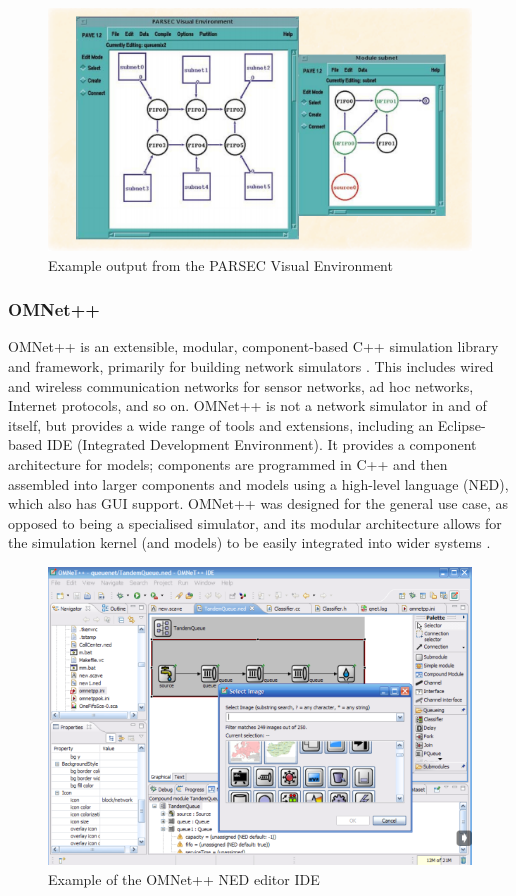 \begin{figure}
\centering	
\includegraphics[scale=0.4]{img/pave}	
\caption{Example output from the PARSEC Visual Environment}
\end{figure}

\subsubsection{OMNet++}
OMNet++ is an extensible, modular, component-based C++ simulation library and framework, primarily for building network simulators \cite{omnet2016}. This includes wired and wireless communication networks for sensor networks, ad hoc networks, Internet protocols, and so on. OMNet++ is not a network simulator in and of itself, but provides a wide range of tools and extensions, including an Eclipse-based IDE (Integrated Development Environment). It provides a component architecture for models; components are programmed in C++ and then assembled into larger components and models using a high-level language (NED), which also has GUI support. OMNet++ was designed for the general use case, as opposed to being a specialised simulator, and its modular architecture allows for the simulation kernel (and models) to be easily integrated into wider systems \cite{varga2008}. 

\begin{figure}
\centering	
\includegraphics[scale=0.4]{img/omnet}	
\caption{Example of the OMNet++ NED editor IDE }
\end{figure}

